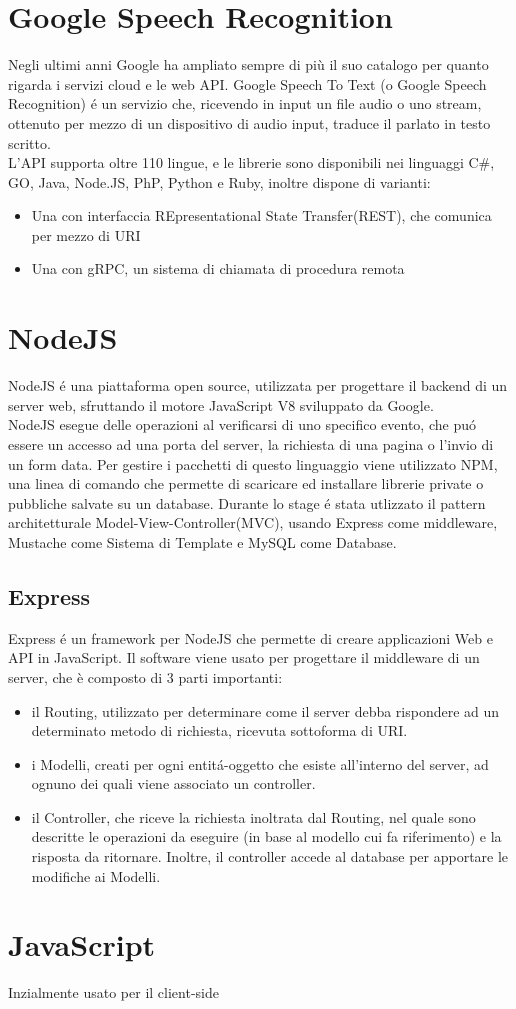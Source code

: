 \section{Google Speech Recognition}
Negli ultimi anni Google ha ampliato sempre di più il suo catalogo per quanto rigarda
i servizi cloud e le web API. Google Speech To Text (o Google Speech Recognition) \'e un
servizio che, ricevendo in input un file audio o uno stream, ottenuto per mezzo di un
dispositivo di audio input, traduce il parlato in testo scritto.\\
L'API supporta oltre 110 lingue, e le librerie sono disponibili nei linguaggi C\#, GO, Java, Node.JS,
PhP, Python e Ruby, inoltre dispone di varianti:
\begin{itemize}
\item Una con interfaccia REpresentational State Transfer(REST), che comunica per mezzo di URI
\item Una con gRPC, un sistema di chiamata di procedura remota
\end{itemize}

\section{NodeJS}
NodeJS \'e una piattaforma open source, utilizzata per progettare il backend di un server web, sfruttando
il motore JavaScript V8 sviluppato da Google.\\
NodeJS esegue delle operazioni al verificarsi di uno specifico evento, che pu\'o essere un accesso ad una porta
del server, la richiesta di una pagina o l'invio di un form data.
Per gestire i pacchetti di questo linguaggio viene utilizzato NPM\cite{NPM}, una linea di comando che permette
di scaricare ed installare librerie private o pubbliche salvate su un database.
Durante lo stage \'e stata utlizzato il pattern architetturale Model-View-Controller(MVC), usando Express
come middleware, Mustache come Sistema di Template e MySQL come Database.

\subsection{Express}
Express \'e un framework per NodeJS che permette di creare applicazioni Web e API in JavaScript.
Il software viene usato per progettare il middleware di un server, che è composto di 3 parti importanti:
\begin{itemize}
\item il Routing, utilizzato per determinare come il server debba rispondere ad un determinato metodo di richiesta,
ricevuta sottoforma di URI.
\item i Modelli, creati per ogni entit\'a-oggetto che esiste all'interno del server, ad ognuno dei quali viene associato
un controller.
\item il Controller, che riceve la richiesta inoltrata dal Routing, nel quale sono descritte le operazioni da eseguire
(in base al modello cui fa riferimento) e la risposta da ritornare. Inoltre, il controller accede al database per apportare 
le modifiche ai Modelli.
\end{itemize}




\section{JavaScript}
Inzialmente usato per il client-side
